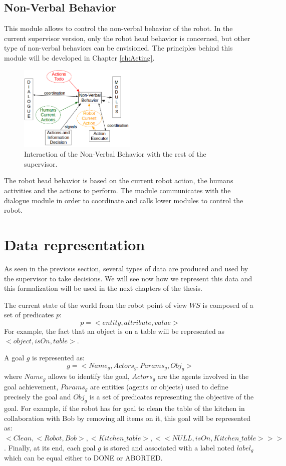 \documentclass[english,a4paper,11pt,twoside]{StyleThese}
\begin{document}
\subsection{Non-Verbal Behavior}

This module allows to control the non-verbal behavior of the robot. In the current supervisor version, only the robot head behavior is concerned, but other type of non-verbal behaviors can be envisioned. The principles behind this module will be developed in Chapter \ref{ch:Acting}.

\begin{figure}[!h]
	\centering
    \includegraphics[width=0.5\textwidth]{figs/Chapter2/NVBehavior.png}
    \caption{Interaction of the Non-Verbal Behavior with the rest of the supervisor.}
    \label{fig:NVBehavior}
\end{figure}

The robot head behavior is based on the current robot action, the humans activities and the actions to perform. The module communicates with the dialogue module in order to coordinate and calls lower modules to control the robot. 

\section{Data representation}

\label{sec:data}

As seen in the previous section, several types of data are produced and used by the supervisor to take decisions. We will see now how we represent this data and this formalization will be used in the next chapters of the thesis.

The current state of the world from the robot point of view $WS$ is composed of a set of predicates $p$:
$$p = <entity, attribute, value>$$
For example, the fact that an object is on a table will be represented as $<object, isOn, table>$.

A goal $g$ is represented as:
$$g = <Name_g, Actors_g, Params_g, Obj_g>$$
where $Name_g$ allows to identify the goal, $Actors_g$ are the agents involved in the goal achievement, $Params_g$ are entities  (agents or objects) used to define precisely the goal and $Obj_g$ is a set of predicates representing the objective of the goal.
For example, if the robot has for goal to clean the table of the kitchen in collaboration with Bob by removing all items on it, this goal will be represented as:
$<Clean, <Robot, Bob>, <Kitchen\_table>, <<NULL, isOn, Kitchen\_table>>>$.
Finally, at its end, each goal $g$ is stored and associated with a label noted $label_g$ which can be equal either to DONE or ABORTED.
\end{document}
